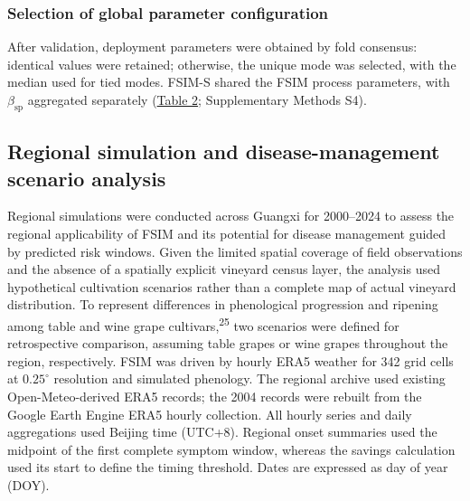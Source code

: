 \documentclass{article}
\begin{document}
\subsubsection{Selection of global parameter
configuration}\label{selection-of-global-parameter-configuration}

After validation, deployment parameters were obtained by fold consensus:
identical values were retained; otherwise, the unique mode was selected,
with the median used for tied modes. FSIM-S shared the FSIM process
parameters, with \(\beta_{\mathrm{sp}}\) aggregated separately
(\hyperref[_Ref226058574]{Table 2}; Supplementary Methods S4).


\subsection{Regional simulation and disease-management scenario
analysis}\label{regional-simulation-and-disease-management-scenario-analysis}

Regional simulations were conducted across Guangxi for 2000--2024 to
assess the regional applicability of FSIM and its potential for disease
management guided by predicted risk windows. Given the limited spatial
coverage of field observations and the absence of a spatially explicit
vineyard census layer, the analysis used hypothetical cultivation
scenarios rather than a complete map of actual vineyard distribution.
To represent differences in phenological progression and ripening among
table and wine grape cultivars,\textsuperscript{25} two scenarios
were defined for retrospective comparison, assuming table grapes or wine
grapes throughout the region, respectively. FSIM was driven by hourly
ERA5 weather for 342 grid cells at $0.25^{\circ}$ resolution and simulated
phenology. The regional archive used existing Open-Meteo-derived ERA5
records; the 2004 records were rebuilt from the Google Earth Engine
ERA5 hourly collection. All hourly series and daily aggregations used
Beijing time (UTC+8). Regional onset summaries used the midpoint of the
first complete symptom window, whereas the savings calculation used its
start to define the timing threshold. Dates are expressed as day of year (DOY).
\end{document}
